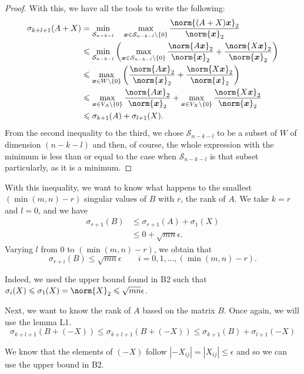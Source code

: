 \documentclass[11pt]{article}
\newcommand{\abs}[1]{\left\lvert#1\right\lvert}
\newcommand{\snorm}[1]{\norm{#1}_2} %
\begin{document}
\begin{proof}
With this, we have all the tools to write the following:
\begin{align*}
\sigma_{k+l + 1}(A+X) &= \min_{\mathcal{S}_{n-k-l}} \quad \max_{\bm{x} \in \mathcal{S}_{n-k-l} \setminus \{0\}} \frac{\snorm{(A+X)\bm{x}}}{\snorm{\bm{x}}}\\
&\leqslant \min_{\mathcal{S}_{n-k-l}} \left( \max_{\bm{x} \in \mathcal{S}_{n-k-l} \setminus \{0\}} \frac{\snorm{A\bm{x}}}{\snorm{\bm{x}}} + \frac{\snorm{X\bm{x}}}{\snorm{\bm{x}}} \right)\\
&\leqslant \max_{\bm{x} \in W \setminus \{0\}}\left( \frac{\snorm{A\bm{x}}}{\snorm{\bm{x}}} + \frac{\snorm{X\bm{x}}}{\snorm{\bm{x}}}\right)\\
&\leqslant \max_{\bm{x} \in V_A \setminus \{0\}} \frac{\snorm{A\bm{x}}}{\snorm{\bm{x}}} + \max_{\bm{x} \in V_X \setminus \{0\}} \frac{\snorm{X\bm{x}}}{\snorm{\bm{x}}}\\
&\leqslant \sigma_{k+1}(A) + \sigma_{l+1}(X).
\end{align*}
From the second inequality to the third, we chose $\mathcal{S}_{n-k-l}$ to be a subset of \(W\) of dimension $(n-k-l)$ and then, of course, the whole expression with the minimum is less than or equal to the case when $\mathcal{S}_{n-k-l}$ is that subset particularly, as it is a minimum.
\end{proof}

With this inequality, we want to know what happens to the smallest $(\min(m,n)-r)$ singular values of \(B\) with \(r\), the rank of \(A\).
We take $k=r$ and $l=0$, and we have 
\begin{align}
\sigma_{r+1}(B) &\leqslant \sigma_{r+1}(A) + \sigma_{1}(X)\\
&\leqslant 0 + \sqrt{mn}\epsilon.
\end{align}
Varying $l$ from $0$ to $(\min(m,n)-r)$, we obtain that 
\[\sigma_{r+i}(B) \leqslant \sqrt{mn}\epsilon \qquad i = 0,1, \dots, (\min(m,n)-r).
\]

Indeed, we used the upper bound found in B2 such that $\sigma_i(X)\leqslant \sigma_1(X)= \snorm{X}\leqslant \sqrt{mn}\epsilon$.

Next, we want to know the rank of \(A\) based on the matrix \(B\). Once again, we will use the lemma L1.
\[
\sigma_{k+l + 1}(B+(-X)) \leqslant \sigma_{k+l + 1}(B+(-X))
\leqslant \sigma_{k+1}(B) + \sigma_{l+1}(-X)
\]

We know that the elements of $(-X)$ follow $ \abs{-X_{ij}} = \abs{X_{ij}} \leqslant \epsilon$ and so we can use the upper bound in B2.
\end{document}
